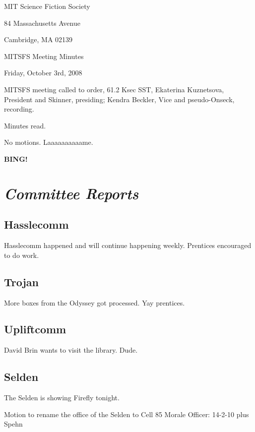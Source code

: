 \documentclass[10pt]{article}
\newcommand{\bing}{{\bf BING!} }
\newcommand{\goto}[1]{\bing \vskip 12pt \section*{{\em{#1}}}}
\newcommand{\ps}{ plus Spehn\xspace}
\begin{document}
\begin{center}

MIT Science Fiction Society

84 Massachusetts Avenue

Cambridge, MA 02139

\vspace{12pt}

MITSFS Meeting Minutes

Friday, October 3rd, 2008

\end{center}

\vspace{18pt}

\setlength{\parskip}{6pt}

\noindent
MITSFS meeting called to order, 61.2 Ksec SST,
Ekaterina Kuznetsova, President and Skinner, presiding; Kendra Beckler, Vice and pseudo-Onseck, recording.

Minutes read.

No motions.  Laaaaaaaaaame.

\BING

\goto{Committee Reports}

\subsection*{Hasslecomm}

Hasslecomm happened and will continue happening weekly.  Prentices encouraged to do work.

\subsection*{Trojan}

More boxes from the Odyssey got processed.  Yay prentices.

\subsection*{Upliftcomm}

David Brin wants to visit the library.  Dude.

\subsection*{Selden}

The Selden is showing Firefly tonight.

Motion to rename the office of the Selden to Cell 85 Morale Officer: 14-2-10 \ps
\end{document}
